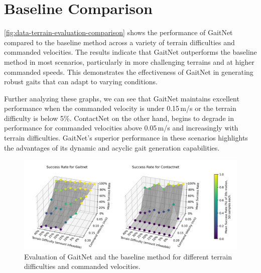 \section{Baseline Comparison}

\autoref{fig:data-terrain-evaluation-comparison} shows the performance
of GaitNet compared to the baseline method across a variety of terrain
difficulties and commanded velocities. The results indicate that GaitNet
outperforms the baseline method in most scenarios, particularly in more
challenging terrains and at higher commanded speeds. This demonstrates
the effectiveness of GaitNet in generating robust gaits that can adapt
to varying conditions.

Further analyzing these graphs, we can see that GaitNet maintains excellent
performance when the commanded velocity is under 0.15\,m/s or the terrain
difficulty is below 5\%. ContactNet on the other hand, begins to degrade in
performance for commanded velocities above 0.05\,m/s and increasingly with
terrain difficulties. GaitNet's superior performance in these scenarios
highlights the advantages of its dynamic and acyclic gait generation
capabilities.

\begin{figure}[H]
  \centering
  \includegraphics[width=\textwidth]{images/data/terrain-evaluation-comparison.png}
  \caption{Evaluation of GaitNet and the baseline method for
  different terrain difficulties and commanded velocities.}
  \label{fig:data-terrain-evaluation-comparison}
\end{figure}
